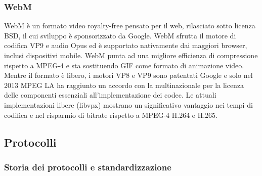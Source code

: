 			\subsubsection{WebM}
			WebM è un formato video royalty-free pensato per il web, rilasciato sotto licenza BSD, il cui sviluppo è sponsorizzato da Google. WebM sfrutta il motore di codifica VP9 e audio Opus ed è supportato nativamente dai maggiori browser, inclusi dispositivi mobile. WebM punta ad una migliore efficienza di compressione rispetto a MPEG-4 e sta sostituendo GIF come formato di animazione video. Mentre il formato è libero, i motori VP8 e VP9 sono patentati Google e solo nel 2013 MPEG LA ha raggiunto un accordo con la multinazionale per la licenza delle componenti essenziali all'implementazione dei codec. Le attuali implementazioni libere (libvpx) mostrano un significativo vantaggio nei tempi di codifica e nel risparmio di bitrate rispetto a MPEG-4 H.264 e H.265.
	 \subsection{Protocolli}
			\subsubsection{Storia dei protocolli e standardizzazione}

